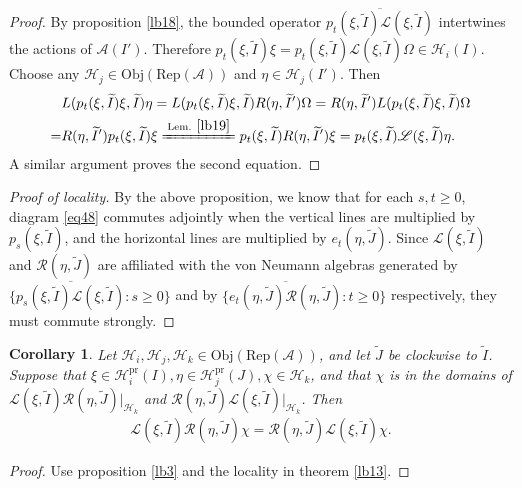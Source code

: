\documentclass[11pt,b5paper,notitlepage]{article}
\theoremstyle{definition}
\theoremstyle{plain}
\newtheorem{co}[df]{Corollary}
\newcommand{\mc}{\mathcal}
\newcommand{\wtd}{\widetilde}
\newcommand{\ovl}{\overline}
\newcommand{\scr}{\mathscr}
\newcommand{\RepA}{\mathrm{Rep}(\mc A)}
\newcommand{\Obj}{\mathrm{Obj}}
\newcommand{\pr}{\mathrm{pr}}
\numberwithin{equation}{subsection}
\begin{document}
\begin{proof}
	By proposition \ref{lb18}, the bounded operator $\ovl{p_t(\xi,\wtd I)\scr L(\xi,\wtd I)}$ intertwines the actions of $\mc A(I')$. Therefore $p_t(\xi,\wtd I)\xi=p_t(\xi,\wtd I)\scr L(\xi,\wtd I)\Omega\in\mc H_i(I)$.  Choose any $\mc H_j\in\Obj(\RepA)$ and $\eta\in\mc H_j(I')$. Then
	\begin{align*}
	&L(p_t(\xi,\wtd I)\xi,\wtd I)\eta=L(p_t(\xi,\wtd I)\xi,\wtd I)R(\eta,\wtd I')\Omega=R(\eta,\wtd I')L(p_t(\xi,\wtd I)\xi,\wtd I)\Omega\\
	=&R(\eta,\wtd I')p_t(\xi,\wtd I)\xi \xlongequal{\text{Lem. } \ref{lb19}} p_t(\xi,\wtd I)R(\eta,\wtd I')\xi=p_t(\xi,\wtd I)\scr L(\xi,\wtd I)\eta.
	\end{align*}
	A similar argument proves the second equation.
\end{proof}


\begin{proof}[Proof of locality]
	By the above proposition, we know that for each $s,t\geq 0$, diagram \eqref{eq48} commutes adjointly when the vertical lines are multiplied by $p_s(\xi,\wtd I)$, and the horizontal lines are multiplied by $e_t(\eta,\wtd J)$. Since $\scr L(\xi,\wtd I)$ and $\scr R(\eta,\wtd J)$ are affiliated with the von Neumann algebras generated by $\{\ovl{p_s(\xi,\wtd I)\scr L(\xi,\wtd I)}:s\geq 0 \}$ and by $\{\ovl {e_t(\eta,\wtd J)\scr R(\eta,\wtd J)}:t\geq 0\}$ respectively, they must commute strongly.
\end{proof} 

\begin{co}\label{lb25}
	Let $\mc H_i,\mc H_j,\mc H_k\in\Obj(\RepA)$, and let $\wtd J$ be clockwise to $\wtd I$. Suppose that $\xi\in\mc H_i^\pr(I),\eta\in\mc H_j^\pr(J),\chi\in\mc H_k$, and that $\chi$ is in the domains of $\scr L(\xi,\wtd I)\scr R(\eta,\wtd J)|_{\mc H_k}$ and $\scr R(\eta,\wtd J)\scr L(\xi,\wtd I)|_{\mc H_k}$. Then
	\begin{align}
	\scr L(\xi,\wtd I)\scr R(\eta,\wtd J)\chi=\scr R(\eta,\wtd J)\scr L(\xi,\wtd I)\chi.
	\end{align}
\end{co}

\begin{proof}
	Use proposition \ref{lb3} and the locality in theorem \ref{lb13}.
\end{proof}
\end{document}
